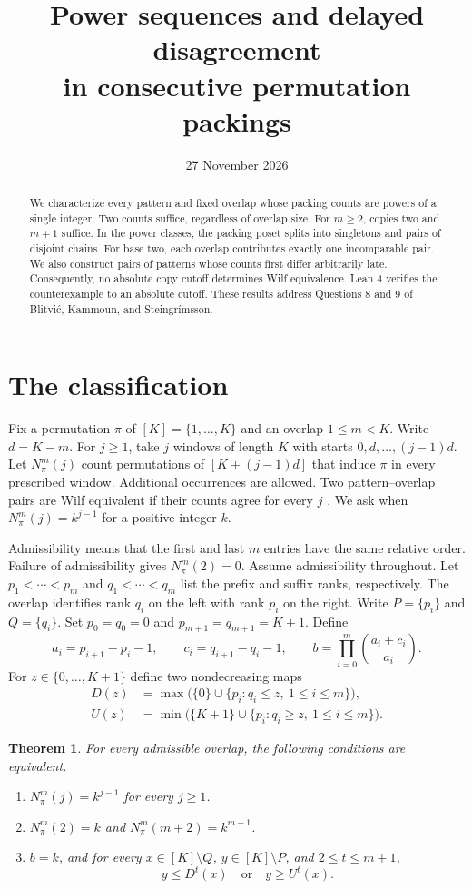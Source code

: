 \documentclass[11pt]{article}
\title{Power sequences and delayed disagreement\\in consecutive permutation packings}
\author{}
\date{27 November 2026}
\newtheorem{theorem}{Theorem}
\newcommand{\N}{N_\pi^m}
\begin{document}
\maketitle
\begin{abstract}
We characterize every pattern and fixed overlap whose packing counts are powers of a single integer.
Two counts suffice, regardless of overlap size. For $m\ge2$, copies two and $m+1$ suffice.
In the power classes, the packing poset splits into singletons and pairs of disjoint chains.
For base two, each overlap contributes exactly one incomparable pair.
We also construct pairs of patterns whose counts first differ arbitrarily late.
Consequently, no absolute copy cutoff determines Wilf equivalence.
Lean 4 verifies the counterexample to an absolute cutoff.
These results address Questions 8 and 9 of Blitvi\'c, Kammoun, and Steingr\'imsson.
\end{abstract}

\section{The classification}
Fix a permutation $\pi$ of $[K]=\{1,\ldots,K\}$ and an overlap $1\le m<K$.
Write $d=K-m$. For $j\ge1$, take $j$ windows of length $K$ with starts $0,d,\ldots,(j-1)d$.
Let $\N(j)$ count permutations of $[K+(j-1)d]$ that induce $\pi$ in every prescribed window.
Additional occurrences are allowed. Two pattern--overlap pairs are Wilf equivalent if their counts agree for every $j$ \cite{bks}.
We ask when $\N(j)=k^{j-1}$ for a positive integer $k$.

Admissibility means that the first and last $m$ entries have the same relative order.
Failure of admissibility gives $\N(2)=0$. Assume admissibility throughout.
Let $p_1<\cdots<p_m$ and $q_1<\cdots<q_m$ list the prefix and suffix ranks, respectively.
The overlap identifies rank $q_i$ on the left with rank $p_i$ on the right.
Write $P=\{p_i\}$ and $Q=\{q_i\}$. Set $p_0=q_0=0$ and $p_{m+1}=q_{m+1}=K+1$.
Define
\[
 a_i=p_{i+1}-p_i-1,\qquad c_i=q_{i+1}-q_i-1,\qquad
 b=\prod_{i=0}^m\binom{a_i+c_i}{a_i}.
\]
For $z\in\{0,\ldots,K+1\}$ define two nondecreasing maps
\begin{align*}
 D(z)&=\max\bigl(\{0\}\cup\{p_i:q_i\le z,\ 1\le i\le m\}\bigr),\\
 U(z)&=\min\bigl(\{K+1\}\cup\{p_i:q_i\ge z,\ 1\le i\le m\}\bigr).
\end{align*}

\begin{theorem}\label{class}
For every admissible overlap, the following conditions are equivalent.
\begin{enumerate}
\item $\N(j)=k^{j-1}$ for every $j\ge1$.
\item $\N(2)=k$ and $\N(m+2)=k^{m+1}$.
\item $b=k$, and for every $x\in[K]\setminus Q$, $y\in[K]\setminus P$, and $2\le t\le m+1$,
\[
 y\le D^t(x)\quad\text{or}\quad y\ge U^t(x).
\]
\end{enumerate}
\end{theorem}
\end{document}
